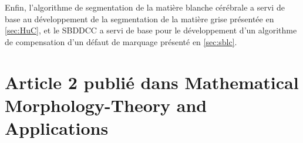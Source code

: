 \documentclass[\main/main.tex]{subfiles}
\begin{document}
%
Enfin, l'algorithme de segmentation de la matière blanche cérébrale a servi de base au
développement de la segmentation de la matière grise présentée en \autoref{sec:HuC},
et le SBDDCC a servi de base pour le développement d'un algorithme de compensation
d'un défaut de marquage \ihc{} présenté en \autoref{sec:sblc}.

\section{Article 2 publié dans Mathematical Morphology\hyp{}Theory and Applications}


\end{document}
